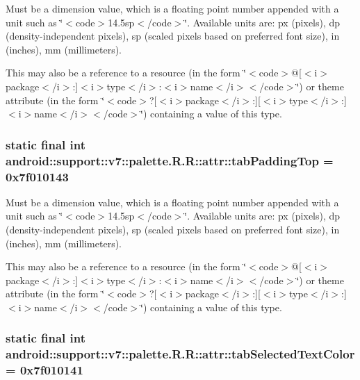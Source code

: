 Must be a dimension value, which is a floating point number appended with a unit such as \char`\"{}$<$code$>$14.5sp$<$/code$>$\char`\"{}. Available units are: px (pixels), dp (density-independent pixels), sp (scaled pixels based on preferred font size), in (inches), mm (millimeters). 

This may also be a reference to a resource (in the form \char`\"{}$<$code$>$@\mbox{[}$<$i$>$package$<$/i$>$:\mbox{]}$<$i$>$type$<$/i$>$:$<$i$>$name$<$/i$>$$<$/code$>$\char`\"{}) or theme attribute (in the form \char`\"{}$<$code$>$?\mbox{[}$<$i$>$package$<$/i$>$:\mbox{]}\mbox{[}$<$i$>$type$<$/i$>$:\mbox{]}$<$i$>$name$<$/i$>$$<$/code$>$\char`\"{}) containing a value of this type. \hypertarget{classandroid_1_1support_1_1v7_1_1palette_1_1_r_1_1attr_e727ee6319f3ac3efd3b6b7b0481baea}{
\subsubsection[{tabPaddingTop}]{\setlength{\rightskip}{0pt plus 5cm}static final int android::support::v7::palette.R.R::attr::tabPaddingTop = 0x7f010143}}
\label{classandroid_1_1support_1_1v7_1_1palette_1_1_r_1_1attr_e727ee6319f3ac3efd3b6b7b0481baea}


Must be a dimension value, which is a floating point number appended with a unit such as \char`\"{}$<$code$>$14.5sp$<$/code$>$\char`\"{}. Available units are: px (pixels), dp (density-independent pixels), sp (scaled pixels based on preferred font size), in (inches), mm (millimeters). 

This may also be a reference to a resource (in the form \char`\"{}$<$code$>$@\mbox{[}$<$i$>$package$<$/i$>$:\mbox{]}$<$i$>$type$<$/i$>$:$<$i$>$name$<$/i$>$$<$/code$>$\char`\"{}) or theme attribute (in the form \char`\"{}$<$code$>$?\mbox{[}$<$i$>$package$<$/i$>$:\mbox{]}\mbox{[}$<$i$>$type$<$/i$>$:\mbox{]}$<$i$>$name$<$/i$>$$<$/code$>$\char`\"{}) containing a value of this type. \hypertarget{classandroid_1_1support_1_1v7_1_1palette_1_1_r_1_1attr_e757482995ca560c77b99bba98952513}{
\subsubsection[{tabSelectedTextColor}]{\setlength{\rightskip}{0pt plus 5cm}static final int android::support::v7::palette.R.R::attr::tabSelectedTextColor = 0x7f010141}}
\label{classandroid_1_1support_1_1v7_1_1palette_1_1_r_1_1attr_e757482995ca560c77b99bba98952513}


